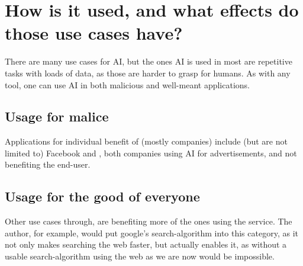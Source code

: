 \chapter{How is it used, and what effects do those use cases have?}




There are many use cases for AI, but the ones AI is used in most are repetitive tasks with loads of data, as those are harder to grasp for humans. As with any tool, one can use AI in both malicious and well-meant applications.
\section{Usage for malice}
Applications for individual benefit of (mostly companies) include (but are not limited to) Facebook \cite{facebookWerbungAufInstagram} and \cite{googleOnlinewerbungLeichtGemacht}, both companies using AI for advertisements, and not benefiting the end-user.
\section{Usage for the good of everyone}
Other use cases through, are benefiting more of the ones using the service. The author, for example, would put google's search-algorithm \cite{googleFunktioniertGoogleSucheSuchalgorithmen} into this category, as it not only makes searching the web faster, but actually enables it, as without a usable search-algorithm using the web as we are now would be impossible.